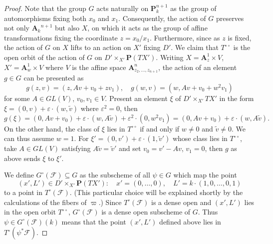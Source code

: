 \documentclass[twoside]{amsart}
\renewcommand{\AA}{\mathbf{A}}
\newcommand{\PP}{\mathbf{P}}
\newcommand{\Ff}{\mathscr{F}}
\newcommand{\ANK}[2]{{\AA_{#2}}^{\! \! \! \!  #1}} %
\newcommand{\AN}[1]{\ANK{#1}{k}}
\theoremstyle{plain}
\theoremstyle{definition}
\theoremstyle{remark}
\numberwithin{equation}{subsection}
\begin{document}
\begin{proof}
Note that the group $G$ acts naturally on $\PP^{n+1}_k$ as the group of automorphisms fixing both $x_0$ and $x_1$. Consequently, the action of $G$ preserves not only $\AN{n+1}$ but also $X$, on which it acts as the group of affine transformations fixing the coordinate $z=x_0/x_1$. Furthermore, since as $z$ is fixed, the action of $G$ on $X$ lifts to an action on $X'$ fixing $D'$. We claim that $T^{\circ\circ}$ is the open orbit of the action of $G$ on $D'\times_{X'} \PP(T X')$. Writing $X=\AA^1_z \times V$, $X'=\AA^1_w\times V$ where $V$ is the affine space $\AA^n_{z_2, \ldots, z_{n+1}}$, the action of an element $g\in G$ can be presented as 
\[ g(z, v) = (z, Av + v_0 + zv_1), \quad g(w, v) = (w, Av + v_0 + w^2 v_1)   \]
for some $A\in GL(V)$, $v_0, v_1\in V$. Present an element $\xi$ of $D'\times_{X'} T X'$ in the form $\xi = (0, v) + \varepsilon\cdot (w, \tilde v)$ where $\varepsilon^2 = 0$, then 
\[ 
	g(\xi) = (0, Av+v_0) + \varepsilon\cdot(w, A\tilde v) + \varepsilon^2\cdot (0, w^2 v_1) = (0, Av+v_0) + \varepsilon\cdot(w, A\tilde v).
\]
On the other hand, the class of $\xi$ lies in $T^{\circ\circ}$ if and only if $w\neq 0$ and $\tilde v \neq 0$. We can thus assume $w=1$. For $\xi' = (0, v') + \varepsilon\cdot (1, \tilde v')$ whose class lies in $T^{\circ\circ}$, take $A\in GL(V)$ satisfying $A\tilde v = \tilde v'$ and set $v_0 = v' -Av$, $v_1 = 0$, then $g$ as above sends $\xi$ to $\xi'$.

We define $G^\circ(\Ff)\subseteq G$ as the subscheme of all $\psi\in G$ which map the point 
\[ 
	(x', L')\in D'\times_{X'} \PP(T X')\colon \quad x' = (0, \ldots, 0), \quad  L' = k\cdot(1,0,\ldots,0, 1)
\] 
to a point in $T^\circ(\Ff)$. (This particular choice will be explained shortly by the calculations of the fibers of $\varpi$.) Since $T^\circ(\Ff)$ is a dense open and $(x', L')$ lies in the open orbit $T^{\circ\circ}$, $G^\circ(\Ff)$ is a dense open subscheme of $G$. Thus $\psi\in G^\circ(\Ff)(k)$ means that the point $(x', L')$ defined above lies in $T^\circ(\psi^* \Ff)$. 


\end{proof}
\end{document}
